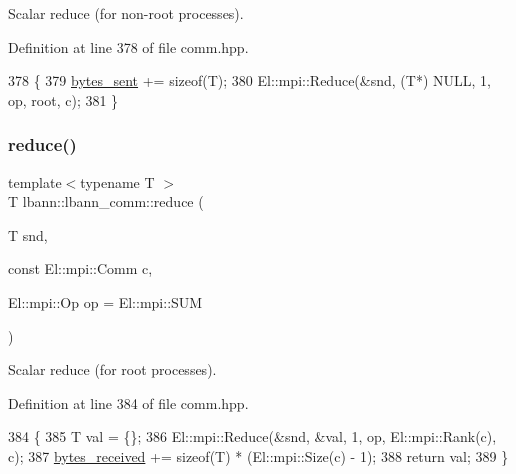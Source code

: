 Scalar reduce (for non-\/root processes). 

Definition at line 378 of file comm.\+hpp.


\begin{DoxyCode}
378                                                                          \{
379     \hyperlink{classlbann_1_1lbann__comm_ad1f146ae7337ece6266fd307944928e0}{bytes\_sent} += \textcolor{keyword}{sizeof}(T);
380     El::mpi::Reduce(&snd, (T*) NULL, 1, op, root, c);
381   \}
\end{DoxyCode}
\mbox{\label{classlbann_1_1lbann__comm_a982adc23d7e6e6224f8bbd846672e429}} 
\subsubsection{\texorpdfstring{reduce()}{reduce()}\hspace{0.1cm}{\footnotesize\ttfamily [2/4]}}
{\footnotesize\ttfamily template$<$typename T $>$ \\
T lbann\+::lbann\+\_\+comm\+::reduce (\begin{DoxyParamCaption}\item[{T}]{snd,  }\item[{const El\+::mpi\+::\+Comm}]{c,  }\item[{El\+::mpi\+::\+Op}]{op = {\ttfamily El\+:\+:mpi\+:\+:SUM} }\end{DoxyParamCaption})\hspace{0.3cm}{\ttfamily [inline]}}

Scalar reduce (for root processes). 

Definition at line 384 of file comm.\+hpp.


\begin{DoxyCode}
384                                                             \{
385     T val = \{\};
386     El::mpi::Reduce(&snd, &val, 1, op, El::mpi::Rank(c), c);
387     \hyperlink{classlbann_1_1lbann__comm_afb99f57f7eafc0695bf28e6c26a8120f}{bytes\_received} += \textcolor{keyword}{sizeof}(T) * (El::mpi::Size(c) - 1);
388     \textcolor{keywordflow}{return} val;
389   \}
\end{DoxyCode}
\mbox{\label{classlbann_1_1lbann__comm_a5543241da0cf9193fd1f331bbad5dd70}} 
